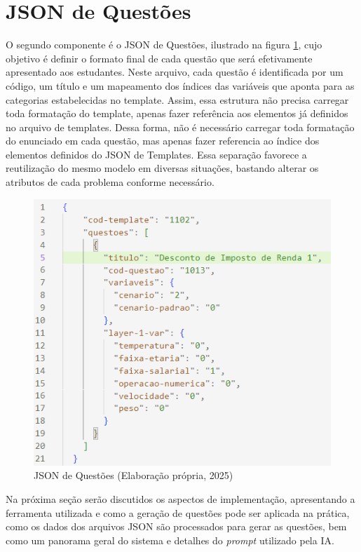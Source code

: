 \section{JSON de Questões}

O segundo componente é o JSON de Questões, ilustrado na figura \ref{fig:json-de-questoes}, cujo objetivo é definir o formato final de cada questão que será efetivamente apresentado aos estudantes. Neste arquivo, cada questão é identificada por um código, um título e um mapeamento dos índices das variáveis que aponta para as categorias estabelecidas no template. Assim, essa estrutura não precisa carregar toda formatação do template, apenas fazer referência aos elementos já definidos no arquivo de templates. Dessa forma, não é necessário carregar toda formatação do enunciado em cada questão, mas apenas fazer referencia ao índice dos elementos definidos do JSON de Templates. Essa separação favorece a reutilização do mesmo modelo em diversas situações, bastando alterar os atributos de cada problema conforme necessário.

\begin{figure}[ht]
	\centering
	\includegraphics[width=12cm]{./imagens/capitulo7/json-de-questoes}
	\caption{JSON de Questões (Elaboração própria, 2025) }
	\label{fig:json-de-questoes}
\end{figure}
Na próxima seção serão discutidos os aspectos de implementação, apresentando a ferramenta utilizada e como a geração de questões pode ser aplicada na prática, como os dados dos arquivos JSON são processados para gerar as questões, bem como um panorama geral do sistema e detalhes do \textit{prompt} utilizado pela IA.

